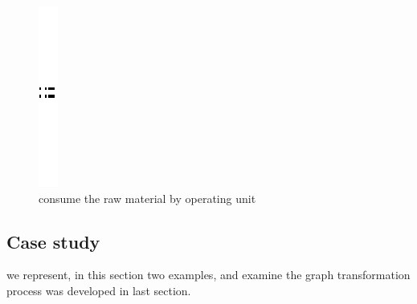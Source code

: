 \begin{figure}[th]
\centering
		\quad{}\quad{}
			\includegraphics{ch3/img/sep}
	\quad{}\quad{}
\caption{\label{fig:consume the raw material by operating unit} consume the raw material by operating unit}
\end{figure}

\pagebreak


\subsection{Case study}
we represent, in this section two examples, and examine the graph transformation process was developed in last section.
